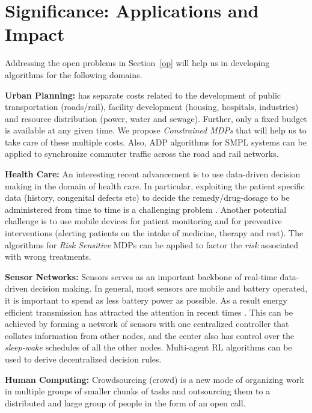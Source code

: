 \section{Significance: Applications and Impact}
Addressing the open problems in Section~\ref{op} will help us in developing algorithms for the following domains.\par
\textbf{Urban Planning:} has separate costs related to the development of public transportation (roads/rail), facility development (housing, hospitals, industries) and resource distribution (power, water and sewage). Further, only a fixed budget is available at any given time. We propose \emph{Constrained MDPs} that will help us to take care of these multiple costs. Also, ADP algorithms for SMPL systems can be applied to synchronize commuter traffic across the road and rail networks.
\par
\textbf{Health Care:} An interesting recent advancement is to use data-driven decision making in the domain of health care. In particular, exploiting the patient specific data (history, congenital defects etc) to decide the remedy/drug-dosage to be administered from time to time is a challenging problem  \cite{mH1}. Another potential challenge is to use mobile devices for patient monitoring and for preventive interventions (alerting patients on the intake of medicine, therapy and rest). The algorithms for \emph{Risk Sensitive } MDPs can be applied to factor the \emph{risk} associated with wrong treatments.\par
\textbf{Sensor Networks:}
Sensors serves as an important backbone of real-time data-driven decision making. In general, most sensors are mobile and battery operated, it is important to spend as less battery power as possible. As a result energy efficient transmission has attracted the attention in recent times \cite{sw}. This can be achieved by forming a network of sensors with one centralized controller that collates information from other nodes, and the center also has control over the \emph{sleep-wake} schedules of all the other nodes. Multi-agent RL algorithms can be used to derive decentralized decision rules.
\par
\textbf{Human Computing:}
Crowdsourcing (crowd) is a new mode of organizing work in multiple groups of smaller chunks of tasks and outsourcing them to a distributed and large group of people in the form of an open call. %
